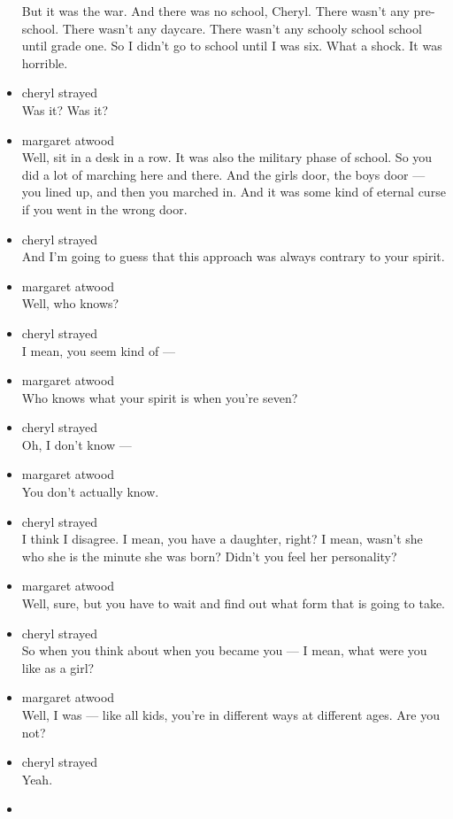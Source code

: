 \begin{itemize}
  But it was the war. And there was no school, Cheryl. There wasn't any
  pre-school. There wasn't any daycare. There wasn't any schooly school
  school until grade one. So I didn't go to school until I was six. What
  a shock. It was horrible.
\item
  cheryl strayed\\
  Was it? Was it?
\item
  margaret atwood\\
  Well, sit in a desk in a row. It was also the military phase of
  school. So you did a lot of marching here and there. And the girls
  door, the boys door --- you lined up, and then you marched in. And it
  was some kind of eternal curse if you went in the wrong door.
\item
  cheryl strayed\\
  And I'm going to guess that this approach was always contrary to your
  spirit.
\item
  margaret atwood\\
  Well, who knows?
\item
  cheryl strayed\\
  I mean, you seem kind of ---
\item
  margaret atwood\\
  Who knows what your spirit is when you're seven?
\item
  cheryl strayed\\
  Oh, I don't know ---
\item
  margaret atwood\\
  You don't actually know.
\item
  cheryl strayed\\
  I think I disagree. I mean, you have a daughter, right? I mean, wasn't
  she who she is the minute she was born? Didn't you feel her
  personality?
\item
  margaret atwood\\
  Well, sure, but you have to wait and find out what form that is going
  to take.
\item
  cheryl strayed\\
  So when you think about when you became you --- I mean, what were you
  like as a girl?
\item
  margaret atwood\\
  Well, I was --- like all kids, you're in different ways at different
  ages. Are you not?
\item
  cheryl strayed\\
  Yeah.
\item

\end{itemize}

